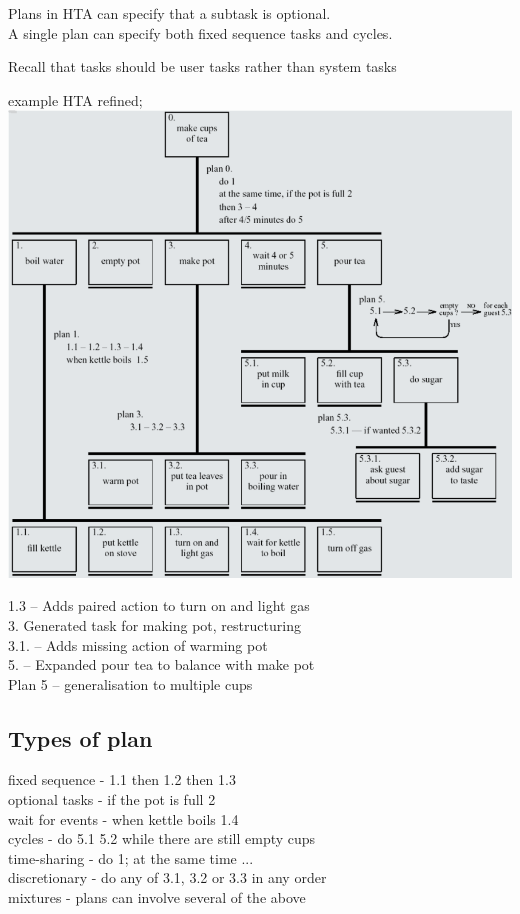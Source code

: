 \documentclass[]{project_plan}
\begin{document}
Plans in HTA can specify that a subtask is optional.\\
A single plan can specify both fixed sequence tasks and cycles.

Recall that tasks should be user tasks rather than system
tasks

example HTA refined;\\
\includegraphics[width=\linewidth]{refined_hta.png}

1.3 – Adds paired action to turn on and light gas\\
3. Generated task for making pot, restructuring\\
3.1. – Adds missing action of warming pot\\
5. – Expanded pour tea to balance with make pot\\
Plan 5 – generalisation to multiple cups

\subsection{Types of plan}
fixed sequence - 1.1 then 1.2 then 1.3\\
optional tasks - if the pot is full 2\\
wait for events - when kettle boils 1.4\\
cycles - do 5.1 5.2 while there are still empty cups\\
time-sharing - do 1; at the same time ...\\
discretionary - do any of 3.1, 3.2 or 3.3 in any order\\
mixtures - plans can involve several of the above
\end{document}
